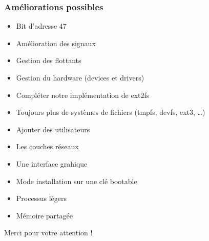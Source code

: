 \documentclass[10pt,a4paper]{beamer}
\begin{document}
\begin{frame}
  \frametitle{Améliorations possibles}
  \begin{itemize}
  \item Bit d'adresse 47
  \item Amélioration des signaux
  \item Gestion des flottants
  \item Gestion du hardware (devices et drivers)
  \item Compléter notre implémentation de ext2fs
  \item Toujours plus de systèmes de fichiers (tmpfs, devfs, ext3, \ldots)
  \item Ajouter des utilisateurs
  \item Les couches réseaux
  \item Une interface grahique
  \item Mode installation sur une clé bootable
  \item Processus légers
  \item Mémoire partagée
  \end{itemize}

  \thinspace{}
  \begin{center}
    \large{Merci pour votre attention !}
  \end{center}

\end{frame}
\end{document}

